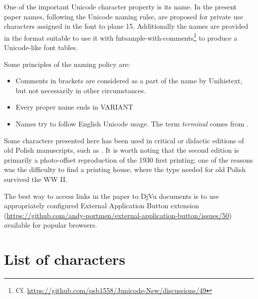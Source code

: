 \documentclass{article}
\newcommand{\pname}[1]{\textsf{#1}}
\begin{document}
  One of the important Unicode character property is its name. In the
  present paper names, following the Unicode naming rulse, are
  proposed for private use characters assigned in the font to plane
  15. Additionally the names are provided in the format suitable to
  use it with
  \pname{fntsample-with-comments}\footnote{Cf. \url{https://github.com/psb1558/Junicode-New/discussions/49}}
  to produce a Unicode-like font tables.
 
Some principles of the naming policy are:
\begin{itemize}
\item Comments in brackets are considered as a part of the name by
  \textsf{Unihistext}, but not necessarily in other circumstances.
\item Every proper name ends in VARIANT
\item Names try to follow English Unicode usage. The term
  \textit{terminal} comes from
  \autocite{gaskell76:_nomec_letter_roman_type}.

\end{itemize}

 
 Some characters presented here has been used in critical or didactic
 editions of old Polish manuscripts, such as
 \autocite{vrtel-wierczyński50:_wybór}. It is worth noting that the
 second edition is primarily a photo-offset reproduction of the 1930
 first printing; one of the reasons was the difficulty to find a printing
 house, where the type needed for old Polish survived the WW II.

The best way to access links in the paper to DjVu documents is to use
appropriately configured External Application Button extension
(\url{https://github.com/andy-portmen/external-application-button/issues/50})
available for popular browsers.

\section{List of characters}
\label{sec:list-characters}
\end{document}
